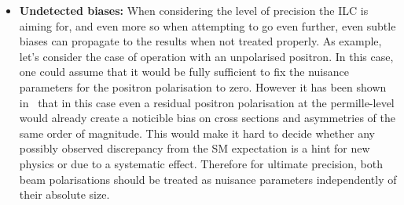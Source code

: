 \begin{itemize}
\item{\textbf{Undetected biases:}} When considering the level of precision the ILC is aiming for, and even more so when attempting to go even further, even subtle biases can propagate to the results when not treated properly. As example, let's consider the case of operation with an unpolarised positron. In this case, one could assume that it would be fully sufficient to fix the nuisance parameters for the positron polarisation to zero. However it has been shown in~\cite{bib:PhDRobert} that in this case even a residual positron polarisation at the permille-level would already create a noticible bias on cross sections and asymmetries of the same order  of magnitude. This would make it hard to decide whether any possibly observed discrepancy from the SM expectation is a hint for new physics or due to a systematic effect. Therefore for ultimate precision, both beam polarisations should be treated as nuisance parameters independently of their absolute size.


\end{itemize}
